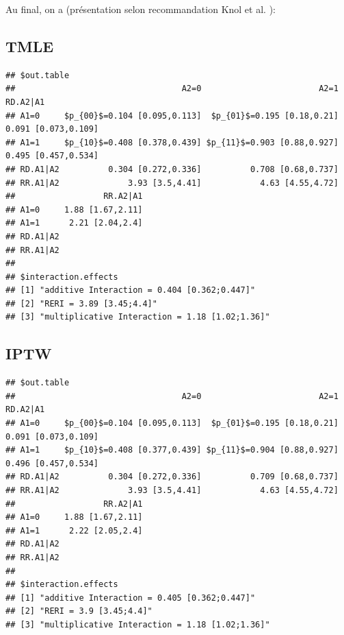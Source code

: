 \documentclass[
]{book}
\begin{document}
Au final, on a (présentation selon recommandation Knol et al. \citet{knol_recommendations_2012}):

\hypertarget{tmle}{%
\subsection*{TMLE}\label{tmle}}

\begin{verbatim}
## $out.table
##                                  A2=0                        A2=1            RD.A2|A1
## A1=0     $p_{00}$=0.104 [0.095,0.113]  $p_{01}$=0.195 [0.18,0.21] 0.091 [0.073,0.109]
## A1=1     $p_{10}$=0.408 [0.378,0.439] $p_{11}$=0.903 [0.88,0.927] 0.495 [0.457,0.534]
## RD.A1|A2          0.304 [0.272,0.336]          0.708 [0.68,0.737]                    
## RR.A1|A2              3.93 [3.5,4.41]            4.63 [4.55,4.72]                    
##                  RR.A2|A1
## A1=0     1.88 [1.67,2.11]
## A1=1      2.21 [2.04,2.4]
## RD.A1|A2                 
## RR.A1|A2                 
## 
## $interaction.effects
## [1] "additive Interaction = 0.404 [0.362;0.447]"   
## [2] "RERI = 3.89 [3.45;4.4]"                       
## [3] "multiplicative Interaction = 1.18 [1.02;1.36]"
\end{verbatim}

\hypertarget{iptw}{%
\subsection*{IPTW}\label{iptw}}

\begin{verbatim}
## $out.table
##                                  A2=0                        A2=1            RD.A2|A1
## A1=0     $p_{00}$=0.104 [0.095,0.113]  $p_{01}$=0.195 [0.18,0.21] 0.091 [0.073,0.109]
## A1=1     $p_{10}$=0.408 [0.377,0.439] $p_{11}$=0.904 [0.88,0.927] 0.496 [0.457,0.534]
## RD.A1|A2          0.304 [0.272,0.336]          0.709 [0.68,0.737]                    
## RR.A1|A2              3.93 [3.5,4.41]            4.63 [4.55,4.72]                    
##                  RR.A2|A1
## A1=0     1.88 [1.67,2.11]
## A1=1      2.22 [2.05,2.4]
## RD.A1|A2                 
## RR.A1|A2                 
## 
## $interaction.effects
## [1] "additive Interaction = 0.405 [0.362;0.447]"   
## [2] "RERI = 3.9 [3.45;4.4]"                        
## [3] "multiplicative Interaction = 1.18 [1.02;1.36]"
\end{verbatim}
\end{document}

